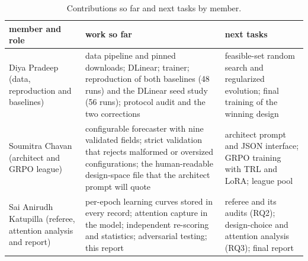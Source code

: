 \documentclass[11pt,letterpaper]{article}
\begin{document}
\begin{table}[htbp]
\centering
\caption{Contributions so far and next tasks by member.}\label{tab:17}
{\footnotesize\setlength{\tabcolsep}{3pt}
\begin{tabular}{>{\raggedright\arraybackslash}p{}>{\raggedright\arraybackslash}p{}>{\raggedright\arraybackslash}p{}}
\toprule
\textbf{member and role} & \textbf{work so far} & \textbf{next tasks} \\
\midrule
Diya Pradeep (data, reproduction and baselines) & data pipeline and pinned downloads; DLinear; trainer; reproduction of both baselines (48 runs) and the DLinear seed study (56 runs); protocol audit and the two corrections & feasible-set random search and regularized evolution; final training of the winning design \\
Soumitra Chavan (architect and GRPO league) & configurable forecaster with nine validated fields; strict validation that rejects malformed or oversized configurations; the human-readable design-space file that the architect prompt will quote & architect prompt and JSON interface; GRPO training with TRL and LoRA; league pool \\
Sai Anirudh Katupilla (referee, attention analysis and report) & per-epoch learning curves stored in every record; attention capture in the model; independent re-scoring and statistics; adversarial testing; this report & referee and its audits (RQ2); design-choice and attention analysis (RQ3); final report \\
\bottomrule
\end{tabular}}
\end{table}
\end{document}
